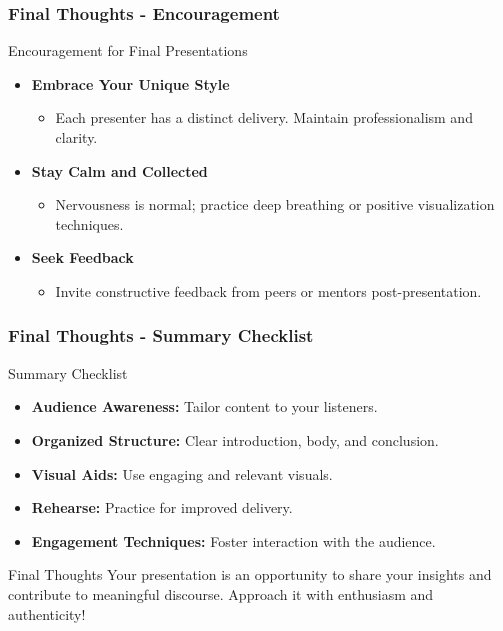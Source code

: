 \documentclass[aspectratio=169]{beamer}
\begin{document}
\begin{frame}[fragile]
    \frametitle{Final Thoughts - Encouragement}
    \begin{block}{Encouragement for Final Presentations}
        \begin{itemize}
            \item \textbf{Embrace Your Unique Style}
            \begin{itemize}
                \item Each presenter has a distinct delivery. Maintain professionalism and clarity.
            \end{itemize}
            \item \textbf{Stay Calm and Collected}
            \begin{itemize}
                \item Nervousness is normal; practice deep breathing or positive visualization techniques.
            \end{itemize}
            \item \textbf{Seek Feedback}
            \begin{itemize}
                \item Invite constructive feedback from peers or mentors post-presentation.
            \end{itemize}
        \end{itemize}
    \end{block}
\end{frame}

\begin{frame}[fragile]
    \frametitle{Final Thoughts - Summary Checklist}
    \begin{block}{Summary Checklist}
        \begin{itemize}
            \item \textbf{Audience Awareness:} Tailor content to your listeners.
            \item \textbf{Organized Structure:} Clear introduction, body, and conclusion.
            \item \textbf{Visual Aids:} Use engaging and relevant visuals.
            \item \textbf{Rehearse:} Practice for improved delivery.
            \item \textbf{Engagement Techniques:} Foster interaction with the audience.
        \end{itemize}
    \end{block}
    \begin{block}{Final Thoughts}
        Your presentation is an opportunity to share your insights and contribute to meaningful discourse. Approach it with enthusiasm and authenticity!
    \end{block}
\end{frame}
\end{document}
